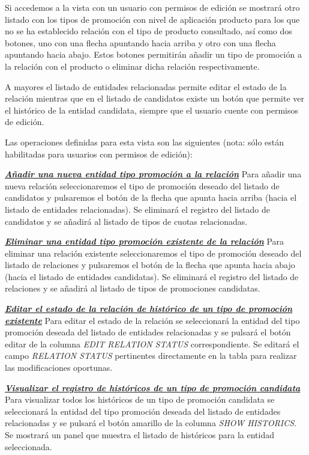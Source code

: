 Si accedemos a la vista con un usuario con permisos de edición se mostrará otro listado con los tipos de promoción con nivel de aplicación producto para los que no se ha establecido relación con el tipo de producto consultado, así como dos botones, uno con una flecha apuntando hacia arriba y otro con una flecha apuntando hacia abajo. Estos botones permitirán añadir un tipo de promoción a la relación con el producto o eliminar dicha relación respectivamente. 

A mayores el listado de entidades relacionadas permite editar el estado de la relación mientras que en el listado de candidatos existe un botón que permite ver el histórico de la entidad candidata, siempre que el usuario cuente con permisos de edición.


Las operaciones definidas para esta vista son las siguientes (nota: sólo están habilitadas para usuarios con permisos de edición):

\underline{\textsl{\textbf{Añadir una nueva entidad tipo promoción a la relación}}} \newline
Para añadir una nueva relación seleccionaremos el tipo de promoción deseado del listado de candidatos y pulsaremos el botón de la flecha que apunta hacia arriba (hacia el listado de entidades relacionadas). Se eliminará el registro del listado de candidatos y se añadirá al listado de tipos de cuotas relacionadas.


\underline{\textsl{\textbf{Eliminar una entidad tipo promoción existente de la relación}}}\newline
Para eliminar una relación existente seleccionaremos el tipo de promoción deseado del listado de relaciones y pulsaremos el botón de la flecha que apunta hacia abajo (hacia el listado de entidades candidatas). Se eliminará el registro del listado de relaciones y se añadirá al listado de tipos de promociones candidatas.


\underline{\textsl{\textbf{Editar el estado de la relación de histórico de un tipo de promoción existente}}}
Para editar el estado de la relación se seleccionará la entidad del tipo promoción  deseada del listado de entidades relacionadas y se pulsará el botón editar de la columna \textit{EDIT RELATION STATUS} correspondiente. Se editará el campo \emph{RELATION STATUS}  pertinentes directamente en la tabla para realizar las modificaciones oportunas.

\underline{\textsl{\textbf{Visualizar el registro de históricos de un tipo de promoción candidata}}}
Para visualizar todos los históricos de un tipo de promoción candidata se seleccionará la entidad del tipo promoción deseada del listado de entidades relacionadas y se pulsará el botón amarillo de la columna \textit{SHOW HISTORICS}. Se mostrará un panel que muestra el listado de históricos para la entidad seleccionada. 



